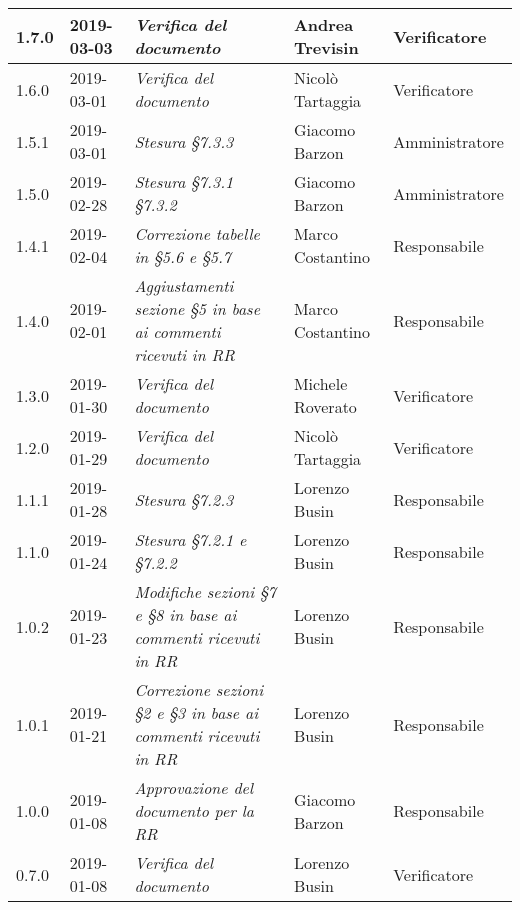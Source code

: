 \begin{longtable}{C{2cm}|C{2.5cm}|C{4.5cm}|C{2.5cm}|C{3cm}}
		1.7.0 & 2019-03-03 & \emph{Verifica del documento} & Andrea Trevisin & Verificatore \\
		\hline

		1.6.0 & 2019-03-01 & \emph{Verifica del documento} & Nicolò Tartaggia & Verificatore \\
		\hline

		1.5.1 & 2019-03-01 & \emph{Stesura §7.3.3} & Giacomo Barzon & Amministratore \\
		\hline

		1.5.0 & 2019-02-28 & \emph{Stesura §7.3.1 §7.3.2} & Giacomo Barzon & Amministratore \\
		\hline

		1.4.1 & 2019-02-04 & \emph{Correzione tabelle in §5.6 e §5.7} & Marco Costantino & Responsabile \\
		\hline

		1.4.0 & 2019-02-01 & \emph{Aggiustamenti sezione §5 in base ai commenti ricevuti in RR} & Marco Costantino & Responsabile \\
		\hline

		1.3.0 & 2019-01-30 & \emph{Verifica del documento} & Michele Roverato & Verificatore \\
		\hline

		1.2.0 & 2019-01-29 & \emph{Verifica del documento} & Nicolò Tartaggia & Verificatore \\
		\hline

		1.1.1 & 2019-01-28 & \emph{Stesura §7.2.3} & Lorenzo Busin & Responsabile \\
		\hline

		1.1.0 & 2019-01-24 & \emph{Stesura §7.2.1 e §7.2.2} & Lorenzo Busin & Responsabile \\
		\hline

		1.0.2 & 2019-01-23 & \emph{Modifiche sezioni §7 e §8 in base ai commenti ricevuti in RR} & Lorenzo Busin & Responsabile \\
		\hline

		1.0.1 & 2019-01-21 & \emph{Correzione sezioni §2 e §3 in base ai commenti ricevuti in RR} & Lorenzo Busin & Responsabile \\
		\hline

		1.0.0 & 2019-01-08 & \emph{Approvazione del documento per la RR} & Giacomo Barzon & Responsabile \\
		\hline

		0.7.0 & 2019-01-08 & \emph{Verifica del documento} & Lorenzo Busin & Verificatore \\
		\hline


\end{longtable}
